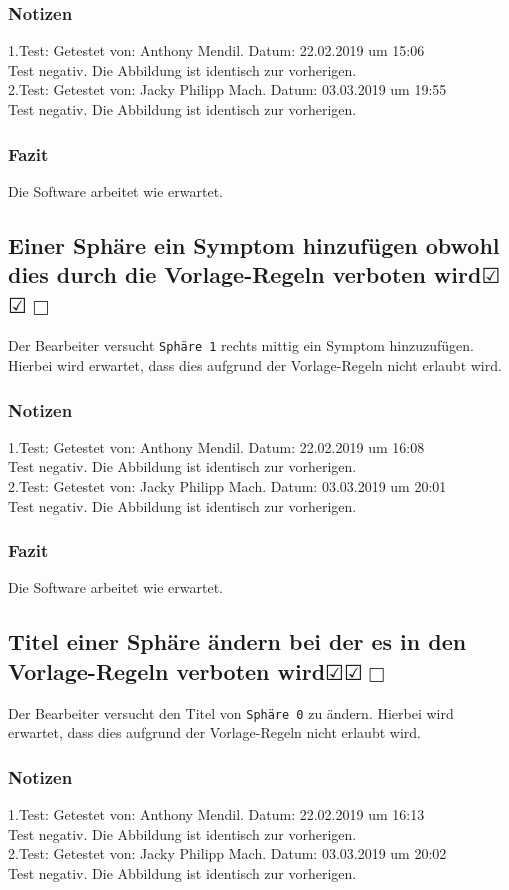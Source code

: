 \documentclass[enabledeprecatedfontcommands]{scrartcl}
\newcommand{\subsectiont}[2]{\subsection[#1]{#1{\normalsize\normalfont #2}}}
\newcommand{\leer}{$\Box$}
\newcommand{\ok}{$\CheckedBox$}
\begin{document}
\subsubsection{Notizen}
1.Test: Getestet von: Anthony Mendil. Datum: 22.02.2019 um 15:06 \\
Test negativ. Die Abbildung ist identisch zur vorherigen.\\
2.Test: Getestet von: Jacky Philipp Mach. Datum: 03.03.2019 um 19:55 \\
Test negativ. Die Abbildung ist identisch zur vorherigen.
\subsubsection{Fazit}
Die Software arbeitet wie erwartet.

\subsectiont{Einer Sphäre ein Symptom hinzufügen obwohl dies durch die Vorlage-Regeln verboten wird}{\dotfill\ok\ok\leer}
Der Bearbeiter versucht \texttt{Sphäre 1} rechts mittig ein Symptom hinzuzufügen. Hierbei wird erwartet, dass dies aufgrund der Vorlage-Regeln nicht erlaubt wird.
\subsubsection{Notizen}
1.Test: Getestet von: Anthony Mendil. Datum: 22.02.2019 um 16:08 \\
Test negativ. Die Abbildung ist identisch zur vorherigen.\\
2.Test: Getestet von: Jacky Philipp Mach. Datum: 03.03.2019 um 20:01 \\
Test negativ. Die Abbildung ist identisch zur vorherigen.
\subsubsection{Fazit}
Die Software arbeitet wie erwartet.

\subsectiont{Titel einer Sphäre ändern bei der es in den Vorlage-Regeln verboten wird}{\dotfill\ok\ok\leer}
Der Bearbeiter versucht den Titel von \texttt{Sphäre 0} zu ändern. Hierbei wird erwartet, dass dies aufgrund der Vorlage-Regeln nicht erlaubt wird.
\subsubsection{Notizen}
1.Test: Getestet von: Anthony Mendil. Datum: 22.02.2019 um 16:13 \\
Test negativ. Die Abbildung ist identisch zur vorherigen.\\
2.Test: Getestet von: Jacky Philipp Mach. Datum: 03.03.2019 um 20:02 \\
Test negativ. Die Abbildung ist identisch zur vorherigen.
\end{document}
